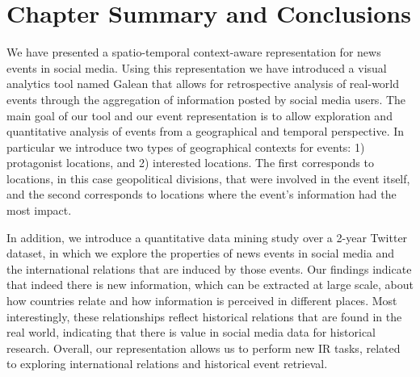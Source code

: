 
\section{Chapter Summary and Conclusions} \label{sec:conclusions}


We have presented a spatio-temporal context-aware representation for news events
in social media. 
%
Using this representation we have introduced a visual analytics tool named
Galean that allows for retrospective analysis of real-world events through the
aggregation of information posted by social media users. 
%
The main goal of our tool and our event representation is to allow exploration
and quantitative analysis of events from a geographical and temporal
perspective. 
%
In particular we introduce two types of geographical contexts for events: 1)
protagonist locations, and 2) interested locations. 
%
The first corresponds to locations, in this case geopolitical divisions, that
were involved in the event itself, and the second corresponds to locations where
the event's information had the most impact.


In addition, we introduce a quantitative data mining study over a 2-year Twitter
dataset, in which we explore the properties of news events in social media and
the international relations that are induced by those events.  
%
Our findings indicate that indeed there is new information, which can be
extracted at large scale, about how countries relate and how information is
perceived in different places. 
%
Most interestingly, these relationships reflect historical relations that are
found in the real world, indicating that there is value in social media data for
historical research.
%
Overall, our representation allows us to perform new IR tasks, related to
exploring international relations and historical event retrieval.
